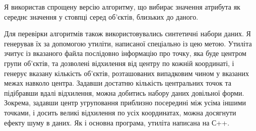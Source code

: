             Я використав спрощену версію алгоритму, що вибирає значення атрибута як середнє значення у стовпці серед об'єктів, близьких до даного.
            
            Для перевірки алгоритмів також використовувались синтетичні набори даних. Я генерував їх за допомогою утиліти, написаної спеціально із цею метою. Утиліта зчитує із вказаного файла послідовно інформацію про точку, яка буде центром групи об'єктів, та дозволені відхилення від центру по кожній координаті, і генерує вказану кількість об'єктів, розташованих випадковим чином у вказаних межах навколо центра. Задавши достатню кількість центральних точок та підібравши вдалі відхилення, можна добитись набору даних довільної форми. Зокрема, задавши центр угруповання приблизно посередині між усіма іншими точками, і досить великі відхилення по усіх координатах, можна досягнути ефекту шуму в даних. Як і основна програма, утиліта написана на С++.
